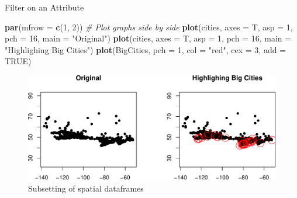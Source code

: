 \documentclass[10pt,ignorenonframetext,]{beamer}
\newenvironment{Shaded}{\begin{snugshade}}{\end{snugshade}}
\newcommand{\KeywordTok}[1]{\textcolor[rgb]{0.13,0.29,0.53}{\textbf{{#1}}}}
\newcommand{\DataTypeTok}[1]{\textcolor[rgb]{0.13,0.29,0.53}{{#1}}}
\newcommand{\DecValTok}[1]{\textcolor[rgb]{0.00,0.00,0.81}{{#1}}}
\newcommand{\StringTok}[1]{\textcolor[rgb]{0.31,0.60,0.02}{{#1}}}
\newcommand{\CommentTok}[1]{\textcolor[rgb]{0.56,0.35,0.01}{\textit{{#1}}}}
\newcommand{\OtherTok}[1]{\textcolor[rgb]{0.56,0.35,0.01}{{#1}}}
\newcommand{\NormalTok}[1]{{#1}}
\begin{document}
\begin{frame}[fragile]{Filter on an Attribute}

\small

\begin{Shaded}
\begin{Highlighting}[]
\KeywordTok{par}\NormalTok{(}\DataTypeTok{mfrow =} \KeywordTok{c}\NormalTok{(}\DecValTok{1}\NormalTok{, }\DecValTok{2}\NormalTok{))  }\CommentTok{# Plot graphs side by side}
\KeywordTok{plot}\NormalTok{(cities, }\DataTypeTok{axes =} \NormalTok{T, }\DataTypeTok{asp =} \DecValTok{1}\NormalTok{, }\DataTypeTok{pch =} \DecValTok{16}\NormalTok{, }\DataTypeTok{main =} \StringTok{"Original"}\NormalTok{)}
\KeywordTok{plot}\NormalTok{(cities, }\DataTypeTok{axes =} \NormalTok{T, }\DataTypeTok{asp =} \DecValTok{1}\NormalTok{, }\DataTypeTok{pch =} \DecValTok{16}\NormalTok{, }\DataTypeTok{main =} \StringTok{"Highlighing Big Cities"}\NormalTok{)}
\KeywordTok{plot}\NormalTok{(BigCities, }\DataTypeTok{pch =} \DecValTok{1}\NormalTok{, }\DataTypeTok{col =} \StringTok{"red"}\NormalTok{, }\DataTypeTok{cex =} \DecValTok{3}\NormalTok{, }\DataTypeTok{add =} \OtherTok{TRUE}\NormalTok{)}
\end{Highlighting}
\end{Shaded}

\begin{figure}

{\centering \includegraphics[width=1\linewidth]{SpatialDataLecture_files/figure-beamer/unnamed-chunk-19-1} 

}

\caption{Subsetting of spatial dataframes}\label{fig:unnamed-chunk-19}
\end{figure}

\normalsize

\end{frame}
\end{document}

